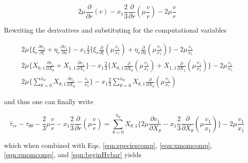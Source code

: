 \begin{displaymath}
	2\mu \frac{\partial}{\partial r}(v) - x_1\frac{2}{3}\frac{\partial}{\partial r}(\mu \frac{v}{r})
	-2\mu \frac{v}{r}
\end{displaymath}
	
	Rewriting the derivatives and substituting for the computational variables

\begin{displaymath}
  \begin{array}{c}
	2\mu\Big\{\xi_r \frac{\partial v_1}{\partial \xi} + \eta_r \frac{\partial v_1}{\partial \eta} \Big\}
	-x_1\frac{2}{3}\Big\{\xi_r\frac{\partial}{\partial \xi}(\mu\frac{v_1}{x_1}) + \eta_r\frac{\partial}
	{\partial \eta}(\mu\frac{v_1}{x_1})\Big\} - 2\mu \frac{v_1}{x_1}
	\\
	2\mu\Big\{X_{0,1} \frac{\partial v_1}{\partial X_0} + X_{1,1} \frac{\partial v_1}{\partial X_1} \Big\}
	-x_1\frac{2}{3}\Big\{X_{0,1}\frac{\partial}{\partial X_0}(\mu\frac{v_1}{x_1}) + X_{1,1}\frac{\partial}
	{\partial X_1}(\mu\frac{v_1}{x_1})\Big\} - 2\mu \frac{v_1}{x_1}
	\\
	2\mu\Big\{\sum_{\theta = 0}^{\bar{n}_d}X_{\theta,1}\frac{\partial v_1}{\partial X_\theta} 
	-\frac{v_1}{x_1} \Big\}
	-x_1\frac{2}{3}\sum_{\theta = 0}^{\bar{n}_d}X_{\theta,1}\frac{\partial}{\partial X_\theta}(\mu\frac{v_1}{x_1})
  \end{array}
\end{displaymath}

	and thus one can finally write

\begin{equation}
	\hat{ \tau}_{rr} -\tau_{\theta \theta} - \frac{2}{3}\mu \frac{v}{r} 
	- x_1\frac{2}{3}\frac{\partial}{\partial r}(\mu \frac{v}{r}) = 
	\sum_{\theta = 0}^{\bar{n}_d}X_{\theta,1}\Big\{2\mu\frac{\partial v_1}{\partial X_\theta} 
	-x_1\frac{2}{3}\frac{\partial}{\partial X_\theta}(\mu\frac{v_1}{x_1})\Big\} - 2\mu\frac{v_1}{x_1}
\label{eqn:rmomcomp}
\end{equation}

	which when combined with Eqs. \ref{eqn:speciescomp}, \ref{eqn:xmomcomp}, \ref{eqn:rmomcomp}, 
and \ref{eqn:beginHvbar} yields

